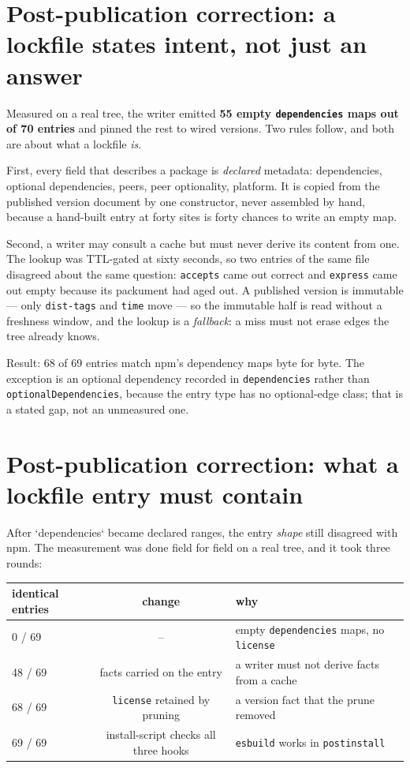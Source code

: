 \documentclass[
  11pt,
  letterpaper,
]{article}
\begin{document}
\section{Post-publication correction: a lockfile states intent, not just an answer}

Measured on a real tree, the writer emitted \textbf{55 empty \texttt{dependencies} maps out of
70 entries} and pinned the rest to wired versions. Two rules follow, and both are about what a
lockfile \emph{is}.

First, every field that describes a package is \emph{declared} metadata: dependencies, optional
dependencies, peers, peer optionality, platform. It is copied from the published version document
by one constructor, never assembled by hand, because a hand-built entry at forty sites is forty
chances to write an empty map.

Second, a writer may consult a cache but must never derive its content from one. The lookup was
TTL-gated at sixty seconds, so two entries of the same file disagreed about the same question:
\texttt{accepts} came out correct and \texttt{express} came out empty because its packument had
aged out. A published version is immutable --- only \texttt{dist-tags} and \texttt{time} move ---
so the immutable half is read without a freshness window, and the lookup is a \emph{fallback}:
a miss must not erase edges the tree already knows.

Result: 68 of 69 entries match npm's dependency maps byte for byte. The exception is an optional
dependency recorded in \texttt{dependencies} rather than \texttt{optionalDependencies}, because
the entry type has no optional-edge class; that is a stated gap, not an unmeasured one.


\section{Post-publication correction: what a lockfile entry must contain}

After `dependencies` became declared ranges, the entry \emph{shape} still disagreed with npm. The
measurement was done field for field on a real tree, and it took three rounds:

\begin{center}
\begin{tabular}{lcl}
identical entries & change & why \\
\hline
0 / 69 & -- & empty \texttt{dependencies} maps, no \texttt{license} \\
48 / 69 & facts carried on the entry & a writer must not derive facts from a cache \\
68 / 69 & \texttt{license} retained by pruning & a version fact that the prune removed \\
69 / 69 & install-script checks all three hooks & \texttt{esbuild} works in \texttt{postinstall} \\
\end{tabular}
\end{center}
\end{document}
